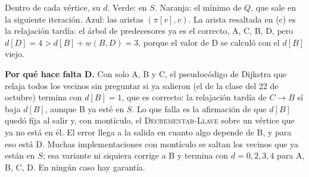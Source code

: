 \documentclass[11pt,letterpaper]{article}
\begin{document}
\begin{ejemplo}
\begin{center}
  \end{center}
  Dentro de cada vértice, su $d$. Verde: en $S$. Naranja: el mínimo de
  $Q$, que sale en la siguiente iteración. Azul: las aristas
  $(\pi[v], v)$. La arista resaltada en (c) es la relajación tardía:
  el árbol de predecesores ya es el correcto, A, C, B, D, pero
  $d[D] = 4 > d[B] + w(B, D) = 3$, porque el valor de D se calculó con
  el $d[B]$ viejo.
\end{ejemplo}

\begin{ojo}
  \textbf{Por qué hace falta D.} Con solo A, B y C, el pseudocódigo de
  Dijkstra que relaja todos los vecinos sin preguntar si ya salieron
  (el de la clase del 22 de octubre) termina con
  $d[B] = 1$, que es correcto: la relajación tardía de $C \to B$ sí
  baja $d[B]$, aunque B ya esté en $S$. Lo que falla es la afirmación
  de que $d[B]$ quedó fija al salir y, con montículo, el
  \textsc{Decrementar-Llave} sobre un vértice que ya no está en él.
  El error llega a la salida en cuanto algo depende de B, y para eso
  está D. Muchas implementaciones con montículo se saltan los vecinos
  que ya están en $S$; esa variante ni siquiera corrige a B y termina
  con $d = 0, 2, 3, 4$ para A, B, C, D. En ningún caso hay garantía.
\end{ojo}
\end{document}
